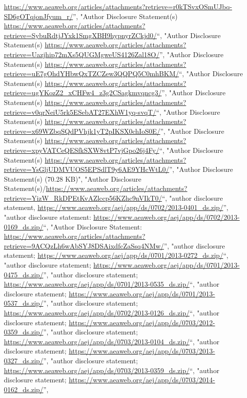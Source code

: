 \documentclass[]{article}
\begin{document}
\begin{itemize}
  \url{https://www.aeaweb.org/articles/attachments?retrieve=r0kTSvxOSmUJbq-SD6gOTqjonJfyum_r/}'',
  "Author Disclosure Statement(s)
  \url{https://www.aeaweb.org/articles/attachments?retrieve=SybuRdtjJYxk1SmgXBH9hypnyrZCkjd0/}``,
  "Author Disclosure Statement(s)
  \url{https://www.aeaweb.org/articles/attachments?retrieve=Uazjhip72mXs5QUGMgweUS4126Zal18O/}'',
  "Author Disclosure Statement(s)
  \url{https://www.aeaweb.org/articles/attachments?retrieve=uE7gOhdYHbwQxTZCZew3QQPQ5C0mhBKM/}``,
  "Author Disclosure Statement(s)
  \url{https://www.aeaweb.org/articles/attachments?retrieve=ugYKozZ2_xCHFw4_z3g2CSagkmvqncg3/}'',
  "Author Disclosure Statement(s)
  \url{https://www.aeaweb.org/articles/attachments?retrieve=v0qrNeiU5rk5ESebAT27EXhW1yq-svqT/}``,
  "Author Disclosure Statement(s)
  \url{https://www.aeaweb.org/articles/attachments?retrieve=x69WZbqSQdPVhjk1yT2pIKSX0chIoS0E/}'',
  "Author Disclosure Statement(s)
  \url{https://www.aeaweb.org/articles/attachments?retrieve=xpyVATCeQESfkSXW8vtP7vjGpo26j4Fy/}``,
  "Author Disclosure Statement(s)
  \url{https://www.aeaweb.org/articles/attachments?retrieve=YsGljUDMVUOS5EPSdlT9y6AE9YHcWtL0/}'',
  "Author Disclosure Statement(s) (70.28 KB)", "Author Disclosure
  Statement(s)/\url{https://www.aeaweb.org/articles/attachments?retrieve=YizW_RkDPEtKvAZlccp56KZhc9nVIkT0/}``,
  "author disclosure statement,
  \url{https://www.aeaweb.org/aej/app/ds/0702/2013-0401_ds.zip/}'',
  "author disclosure statement:
  \url{https://www.aeaweb.org/aej/app/ds/0702/2013-0169_ds.zip/}``,
  "Author Disclosure Statement:
  \url{https://www.aeaweb.org/articles/attachments?retrieve=9ACQzLh6wAbSYJ8DSAixdfcZaSsq4NMw/}'',
  "author disclosure statement;
  \url{https://www.aeaweb.org/aej/app/ds/0701/2013-0272_ds.zip/}``,
  "author disclosure statement;
  \url{https://www.aeaweb.org/aej/app/ds/0701/2013-0475_ds.zip/}'',
  "author disclosure statement;
  \url{https://www.aeaweb.org/aej/app/ds/0701/2013-0535_ds.zip/}``,
  "author disclosure statement;
  \url{https://www.aeaweb.org/aej/app/ds/0701/2013-0537_ds.zip/}'',
  "author disclosure statement;
  \url{https://www.aeaweb.org/aej/app/ds/0702/2013-0126_ds.zip/}``,
  "author disclosure statement;
  \url{https://www.aeaweb.org/aej/app/ds/0703/2012-0359_ds.zip/}'',
  "author disclosure statement;
  \url{https://www.aeaweb.org/aej/app/ds/0703/2013-0104_ds.zip/}``,
  "author disclosure statement;
  \url{https://www.aeaweb.org/aej/app/ds/0703/2013-0327_ds.zip/}'',
  "author disclosure statement;
  \url{https://www.aeaweb.org/aej/app/ds/0703/2013-0359_ds.zip/}``,
  "author disclosure statement;
  \url{https://www.aeaweb.org/aej/app/ds/0703/2014-0162_ds.zip/}'',

\end{itemize}
\end{document}
